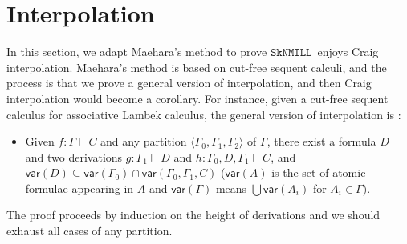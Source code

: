 \documentclass[sn-mathphys-num]{sn-jnl}%
\newcommand{\vdG}{\vdash}
\newcommand{\vdL}{\vdash_{L}}
\newcommand{\NL}{$\mathtt{NL}$}
\newcommand{\SkNMILL}{$\mathtt{SkNMILL}$}
\newcommand{\LSkNL}{$\mathtt{LSkNL}$}
\newcommand{\vars}[1]{\mathsf{var}(#1)}
\theoremstyle{thmstyleone}%
\theoremstyle{thmstyletwo}%
\theoremstyle{thmstylethree}%
\begin{document}
\section{Interpolation}
In this section, we adapt Maehara's method to prove \SkNMILL~enjoys Craig interpolation.
Maehara's method is based on cut-free sequent calculi, and the process is that we prove a general version of interpolation, and then Craig interpolation would become a corollary.
For instance, given a cut-free sequent calculus for associative Lambek calculus, the general version of interpolation is \cite{ono:proof:nonclassical:1998}:
\begin{itemize}
  \item[\ ] Given $f : \Gamma \vdash C$ and any partition $\langle \Gamma_0, \Gamma_1, \Gamma_2 \rangle$ of $\Gamma$, there exist a formula $D$ and two derivations $g : \Gamma_1 \vdash D$ and $h : \Gamma_0, D, \Gamma_1 \vdash C$, and $\vars{D} \subseteq \vars{\Gamma_0} \cap \vars{\Gamma_0, \Gamma_1, C}$ ($\vars{A}$ is the set of atomic formulae appearing in $A$ and $\vars{\Gamma}$ means $\bigcup \vars{A_i}$ for $A_i \in \Gamma$).
\end{itemize}
The proof proceeds by induction on the height of derivations and we should exhaust all cases of any partition.
\end{document}
